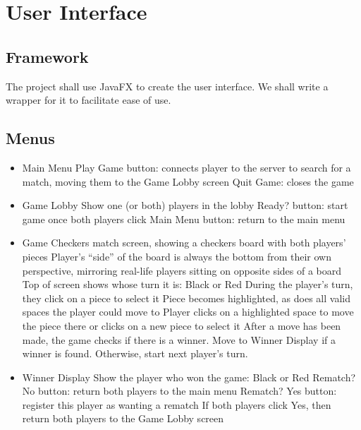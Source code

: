 \documentclass{scrreprt}
\begin{document}
\chapter{User Interface}

\section{Framework}

The project shall use JavaFX to create the user interface. We shall write a wrapper for it to facilitate ease of use.

\section{Menus}

\begin{itemize}
\item Main Menu
    \subitem Play Game button: connects player to the server to search for a match, moving them to the Game Lobby screen
    \subitem Quit Game: closes the game

\item Game Lobby
    \subitem Show one (or both) players in the lobby
    \subitem Ready? button: start game once both players click
    \subitem Main Menu button: return to the main menu

\item Game
    \subitem Checkers match screen, showing a checkers board with both players’ pieces
        \subsubitem Player’s “side” of the board is always the bottom from their own perspective, mirroring real-life players sitting on opposite sides of a board
    \subitem Top of screen shows whose turn it is: Black or Red
        \subsubitem During the player’s turn, they click on a piece to select it
        \subsubitem Piece becomes highlighted, as does all valid spaces the player could move to
        \subsubitem Player clicks on a highlighted space to move the piece there or clicks on a new piece to select it
        \subsubitem After a move has been made, the game checks if there is a winner. Move to Winner Display if a winner is found. Otherwise, start next player’s turn.

\item Winner Display
    \subitem Show the player who won the game: Black or Red
    \subitem Rematch? No button: return both players to the main menu
    \subitem Rematch? Yes button: register this player as wanting a rematch
        \subsubitem If both players click Yes, then return both players to the Game Lobby screen
\end{itemize}
\end{document}
